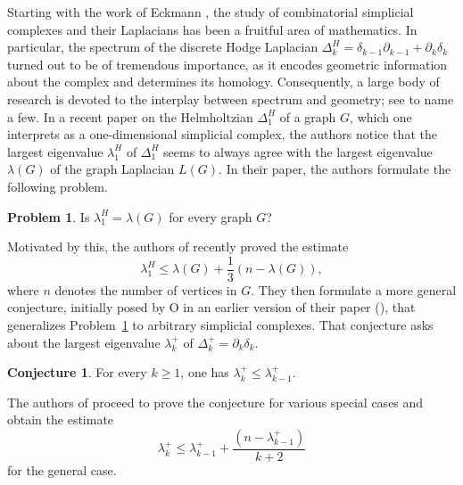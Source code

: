 \documentclass[10pt]{amsart}
\theoremstyle{definition}
\newtheorem{problem}[theorem]{Problem}
\newtheorem{conjecture}[theorem]{Conjecture}
\begin{document}
Starting with the work of Eckmann \cite{Eckmann1944}, the study of combinatorial simplicial complexes and their Laplacians has been a fruitful area of mathematics. In particular, the spectrum of the discrete Hodge Laplacian $\Delta^H_k = \delta_{k-1}\partial_{k-1}+\partial_{k}\delta_k$ turned out to be of tremendous importance, as it encodes geometric information about the complex and determines its homology. Consequently, a large body of research is devoted to the interplay between spectrum and geometry; see \cite{AharoniBergerMeshulam,SO2,DuvRei,GundertWagner,HJ,lewfaces,lew2025eigenvalue,oppenheim_local,ShuklaYogeshwaran,zhang2026upper} to name a few.
In a recent paper \cite{HelmholzianGraph} on the Helmholtzian $\Delta^H_1$ of a graph $G$, which one interprets as a one-dimensional simplicial complex, the authors notice that the largest eigenvalue $\lambda^H_1$ of $\Delta^H_1$ seems to always agree with the largest eigenvalue $\lambda(G)$ of the graph Laplacian $L(G).$ In their paper, the authors formulate the following problem.
\begin{problem}\label{problem}
Is $\lambda^H_1 = \lambda(G)$ for every graph $G$?
\end{problem}
Motivated by this, the authors of \cite{SO2} recently proved the estimate
\[\lambda^H_1\leq \lambda(G)+\frac{1}{3}(n-\lambda(G)),\] where $n$ denotes the number of vertices in $G.$ They then formulate a more general conjecture, initially posed by O in an earlier version of their paper (\cite{SO1}), that generalizes Problem~\ref{problem} to arbitrary simplicial complexes. That conjecture asks about the largest eigenvalue $\lambda^+_k$ of $\Delta^+_k = \partial_k\delta_k.$

\begin{conjecture}\label{Ocon}
    For every $k\geq 1$, one has $\lambda^+_k\leq\lambda^+_{k-1}.$
\end{conjecture}

The authors of \cite{SO2} proceed to prove the conjecture for various special cases and obtain the estimate
\[\lambda^+_k\leq \lambda^+_{k-1} + \frac{(n-\lambda^+_{k-1})}{k+2}\]
for the general case.
\end{document}
